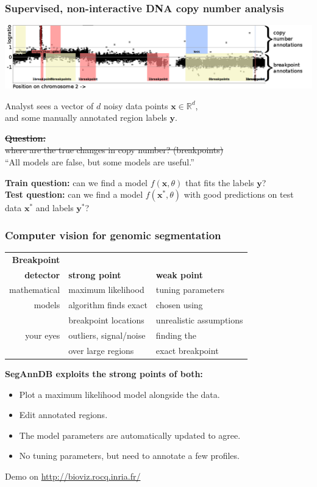 \documentclass{beamer}
\newcommand{\RR}{\mathbb R}
\begin{document}
\begin{frame}
  \frametitle{Supervised, non-interactive DNA copy number analysis}

  \includegraphics[width=\textwidth]{regions-axes-full}

  Analyst sees a vector of $d$ noisy data points $\mathbf x\in\RR^d$,\\
  and some manually annotated region labels $\mathbf y$.

  \vskip 0.1in

  \sout{\textbf{Question:}\\
  where are the true changes in copy
  number? (breakpoints)}
  \\
  ``All models are false, but some models are useful.''

  \vskip 0.1in

  \textbf{Train question:} can we find a model $f(\mathbf x, \theta)$
  that fits the labels $\mathbf y$?
  \\
  \textbf{Test question:} can we find a model $f(\mathbf x^*, \theta)$
  with good predictions on test data $\mathbf x^*$ and labels $\mathbf y^*$?
\end{frame}

\begin{frame}
  \frametitle{Computer vision for genomic segmentation}
  \begin{tabular}{rll}
    \textbf{Breakpoint}\\
 \textbf{detector} & \textbf{strong point} & \textbf{weak point} \\
    \hline
    mathematical  & maximum likelihood & tuning parameters \\
    models & algorithm finds exact  & chosen using\\
& breakpoint locations  & unrealistic assumptions\\
    \hline
    your eyes & outliers, signal/noise & finding the \\
    & over large regions &  exact breakpoint
  \end{tabular}
\vskip 1cm
\textbf{SegAnnDB exploits the strong points of both:}
\begin{itemize}
\item Plot a maximum likelihood model alongside the data.
\item Edit annotated regions.
\item The model parameters are automatically updated to agree.
\item No tuning parameters, but need to annotate a few profiles.
\end{itemize}
Demo on \url{http://bioviz.rocq.inria.fr/}
\end{frame}
\end{document}
